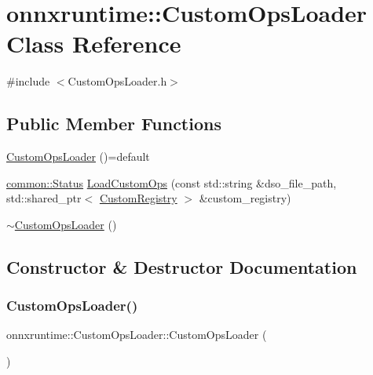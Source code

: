 \hypertarget{classonnxruntime_1_1CustomOpsLoader}{}\section{onnxruntime\+:\+:Custom\+Ops\+Loader Class Reference}
\label{classonnxruntime_1_1CustomOpsLoader}


{\ttfamily \#include $<$Custom\+Ops\+Loader.\+h$>$}

\subsection*{Public Member Functions}
\begin{DoxyCompactItemize}
\item 
\mbox{\hyperlink{classonnxruntime_1_1CustomOpsLoader_ad50fcc21824b2188841d9beb3f6f89f3}{Custom\+Ops\+Loader}} ()=default
\item 
\mbox{\hyperlink{classonnxruntime_1_1common_1_1Status}{common\+::\+Status}} \mbox{\hyperlink{classonnxruntime_1_1CustomOpsLoader_a07100e9ec2cf644807254969c7d09d24}{Load\+Custom\+Ops}} (const std\+::string \&dso\+\_\+file\+\_\+path, std\+::shared\+\_\+ptr$<$ \mbox{\hyperlink{classonnxruntime_1_1CustomRegistry}{Custom\+Registry}} $>$ \&custom\+\_\+registry)
\item 
\mbox{\hyperlink{classonnxruntime_1_1CustomOpsLoader_a83f3547783e89680f22aacd1deb838f3}{$\sim$\+Custom\+Ops\+Loader}} ()
\end{DoxyCompactItemize}


\subsection{Constructor \& Destructor Documentation}
\mbox{\label{classonnxruntime_1_1CustomOpsLoader_ad50fcc21824b2188841d9beb3f6f89f3}} 
\subsubsection{\texorpdfstring{Custom\+Ops\+Loader()}{CustomOpsLoader()}}
{\footnotesize\ttfamily onnxruntime\+::\+Custom\+Ops\+Loader\+::\+Custom\+Ops\+Loader (\begin{DoxyParamCaption}{ }\end{DoxyParamCaption})\hspace{0.3cm}{\ttfamily [default]}}

